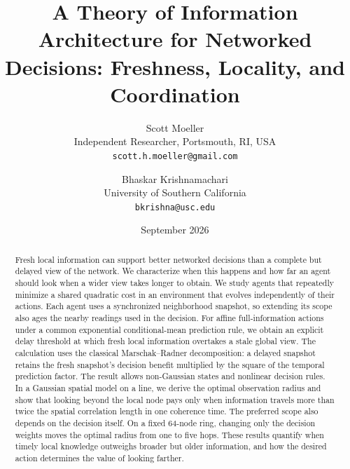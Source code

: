 \documentclass[11pt]{article}
\begin{document}
\title{A Theory of Information Architecture for Networked Decisions:
Freshness, Locality, and Coordination}
\author{
Scott Moeller\\
\small Independent Researcher, Portsmouth, RI, USA\\
\small \texttt{scott.h.moeller@gmail.com}
\and
Bhaskar Krishnamachari\\
\small University of Southern California\\
\small \texttt{bkrishna@usc.edu}
}

\date{September 2026}


\maketitle

\begin{abstract}
Fresh local information can support better networked decisions than a complete but delayed view of the network. We characterize when this happens and how far an agent should look when a wider view takes longer to obtain. We study agents that repeatedly minimize a shared quadratic cost in an environment that evolves independently of their actions. Each agent uses a synchronized neighborhood snapshot, so extending its scope also ages the nearby readings used in the decision. For affine full-information actions under a common exponential conditional-mean prediction rule, we obtain an explicit delay threshold at which fresh local information overtakes a stale global view. The calculation uses the classical Marschak--Radner decomposition: a delayed snapshot retains the fresh snapshot's decision benefit multiplied by the square of the temporal prediction factor. The result allows non-Gaussian states and nonlinear decision rules. In a Gaussian spatial model on a line, we derive the optimal observation radius and show that looking beyond the local node pays only when information travels more than twice the spatial correlation length in one coherence time. The preferred scope also depends on the decision itself. On a fixed 64-node ring, changing only the decision weights moves the optimal radius from one to five hops. These results quantify when timely local knowledge outweighs broader but older information, and how the desired action determines the value of looking farther.
\end{abstract}
\end{document}
